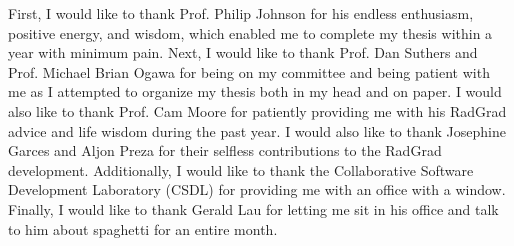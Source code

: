 
\begin{acknowledgments}

First, I would like to thank Prof. Philip Johnson for his endless enthusiasm, positive energy, and wisdom, which enabled me to complete my thesis within a year with minimum pain. Next, I would like to thank Prof. Dan Suthers and Prof. Michael Brian Ogawa for being on my committee and being patient with me as I attempted to organize my thesis both in my head and on paper. I would also like to thank Prof. Cam Moore for patiently providing me with his RadGrad advice and life wisdom during the past year. I would also like to thank Josephine Garces and Aljon Preza for their selfless contributions to the RadGrad development. Additionally, I would like to thank the Collaborative Software Development Laboratory (CSDL) for providing me with an office with a window. Finally, I would like to thank Gerald Lau for letting me sit in his office and talk to him about spaghetti for an entire month. 

\end{acknowledgments}
